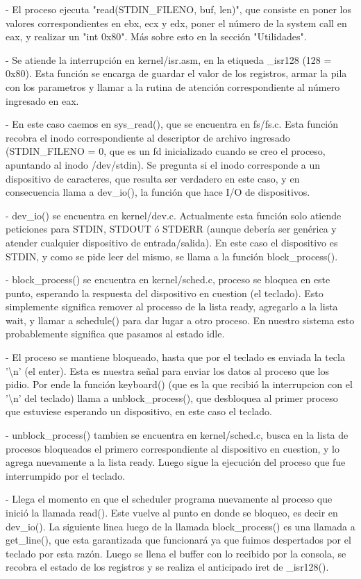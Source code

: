 - El proceso ejecuta "read(STDIN\_FILENO, buf, len)", que consiste en poner los
valores correspondientes en ebx, ecx y edx, poner el número de la system call
en eax, y realizar un "int 0x80". Más sobre esto en la sección "Utilidades".

- Se atiende la interrupción en kernel/isr.asm, en la etiqueda \_isr128 (128
= 0x80). Esta función se encarga de guardar el valor de los registros, armar
la pila con los parametros y llamar a la rutina de atención correspondiente
al número ingresado en eax.

- En este caso caemos en sys\_read(), que se encuentra en fs/fs.c. Esta función
recobra el inodo correspondiente al descriptor de archivo ingresado
(STDIN\_FILENO = 0, que es un fd inicializado cuando se creo el proceso,
apuntando al inodo /dev/stdin). Se pregunta si el inodo corresponde a un
dispositivo de caracteres, que resulta ser verdadero en este caso, y en
consecuencia llama a dev\_io(), la función que hace I/O de dispositivos.

- dev\_io() se encuentra en kernel/dev.c. Actualmente esta función solo atiende
peticiones para STDIN, STDOUT ó STDERR (aunque debería ser genérica y atender
cualquier dispositivo de entrada/salida). En este caso el dispositivo es STDIN,
y como se pide leer del mismo, se llama a la función block\_process().

- block\_process() se encuentra en kernel/sched.c, proceso se bloquea en este
punto, esperando la respuesta del dispositivo en cuestion (el teclado). Esto
simplemente significa remover al processo de la lista ready, agregarlo a la
lista wait, y llamar a schedule() para dar lugar a otro proceso. En nuestro
sistema esto probablemente significa que pasamos al estado idle.

- El proceso se mantiene bloqueado, hasta que por el teclado es enviada la
tecla '\textbackslash n' (el enter). Esta es nuestra señal para enviar los
datos al proceso que los pidio. Por ende la función keyboard() (que es la
que recibió la interrupcion con el '\textbackslash n' del teclado) llama a
unblock\_process(), que desbloquea al primer proceso que estuviese esperando
un dispositivo, en este caso el teclado.

- unblock\_process() tambien se encuentra en kernel/sched.c, busca en la lista
de procesos bloqueados el primero correspondiente al dispositivo en cuestion,
y lo agrega nuevamente a la lista ready. Luego sigue la ejecución del proceso
que fue interrumpido por el teclado.

- Llega el momento en que el scheduler programa nuevamente al proceso que
inició la llamada read(). Este vuelve al punto en donde se bloqueo, es decir en
dev\_io(). La siguiente linea luego de la llamada block\_process() es una
llamada a get\_line(), que esta garantizada que funcionará ya que fuimos
despertados por el teclado por esta razón. Luego se llena el buffer con lo
recibido por la consola, se recobra el estado de los registros y se realiza el
anticipado iret de \_isr128().

